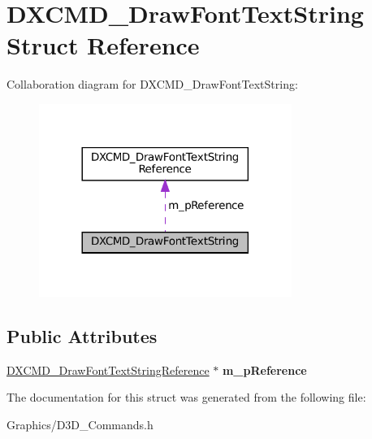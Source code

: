 \hypertarget{structDXCMD__DrawFontTextString}{}\section{D\+X\+C\+M\+D\+\_\+\+Draw\+Font\+Text\+String Struct Reference}
\label{structDXCMD__DrawFontTextString}


Collaboration diagram for D\+X\+C\+M\+D\+\_\+\+Draw\+Font\+Text\+String\+:
\nopagebreak
\begin{figure}[H]
\begin{center}
\leavevmode
\includegraphics[width=233pt]{structDXCMD__DrawFontTextString__coll__graph}
\end{center}
\end{figure}
\subsection*{Public Attributes}
\begin{DoxyCompactItemize}
\item 
\mbox{\label{structDXCMD__DrawFontTextString_a0dae70689e090e5eaef1f450abe7dc04}} 
\hyperlink{structDXCMD__DrawFontTextStringReference}{D\+X\+C\+M\+D\+\_\+\+Draw\+Font\+Text\+String\+Reference} $\ast$ {\bfseries m\+\_\+p\+Reference}
\end{DoxyCompactItemize}


The documentation for this struct was generated from the following file\+:\begin{DoxyCompactItemize}
\item 
Graphics/D3\+D\+\_\+\+Commands.\+h\end{DoxyCompactItemize}
